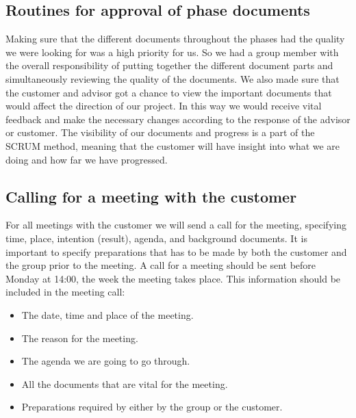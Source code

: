 \subsection{Routines for approval of phase documents}
Making sure that the different documents throughout the phases had the quality we were looking for was a high priority for us. So we had a group member with the overall responsibility of putting together the different document parts and simultaneously reviewing the quality of the documents.
\newline
\newline 
We also made sure that the customer and advisor got a chance to view the important documents that would affect the direction of our project. In this way we would receive vital feedback and make the necessary changes according to the response of the advisor or customer. 
\newline
\newline
The visibility of our documents and progress is a part of the SCRUM method, meaning that the customer will have insight into what we are doing and how far we have progressed.   

\subsection{Calling for a meeting with the customer}
For all meetings with the customer we will send a call for the meeting, specifying time, place, intention (result), agenda, and background documents. It is important to specify preparations that has to be made by both the customer and the group prior to the meeting.
\newline
\newline
A call for a meeting should be sent before Monday at 14:00, the week the meeting takes place.
\newline
\newline
This information should be included in the meeting call:
\begin{itemize}
\item{}The date, time and place of the meeting.
\item{}The reason for the meeting.
\item{}The agenda we are going to go through.
\item{}All the documents that are vital for the meeting.
\item{}Preparations required by either by the group or the customer.
\end{itemize}

